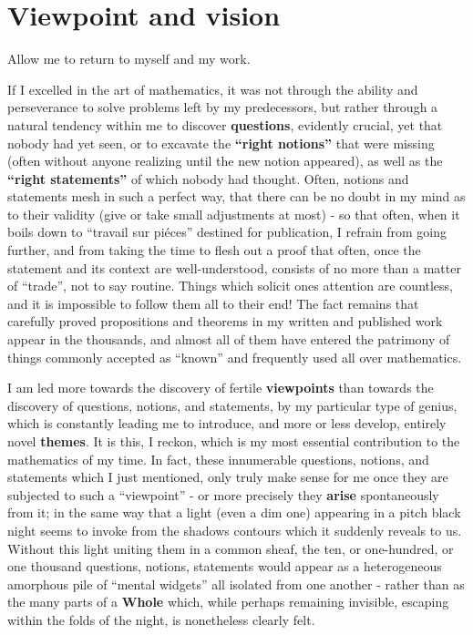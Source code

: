 \section{Viewpoint and vision}

Allow me to return to myself and my work.

If I excelled in the art of mathematics,
it was not through the ability and perseverance to solve problems left by my predecessors,
but rather through a natural tendency within me to 
discover \textbf{questions},
evidently crucial, yet that nobody had yet seen, or to excavate the \textbf{``right notions''}
that were missing
(often without anyone realizing until the new notion appeared), as well as the
\textbf{``right statements''} of which nobody had thought.
Often, notions and statements mesh in such a perfect way, that there can be no doubt in my
mind as to their validity (give or take small adjustments at most) - so that often, when
it boils down to ``travail sur pi\'eces'' destined for publication, I refrain from going
further, and from taking the time to flesh out a proof that often, once the statement and
its context are well-understood, consists of no more than a matter of ``trade'', not to
say routine.
Things which solicit ones attention are countless, and it is impossible to follow 
them all to their end! 
The fact remains that carefully proved propositions and theorems in my written and
published work appear in the thousands, and almost all of them have entered the 
patrimony of things commonly accepted as ``known'' and frequently used all over
mathematics.

I am led more towards the discovery of
fertile \textbf{viewpoints} 
than towards the discovery of questions, notions, and statements, by my particular type of
genius, which is constantly leading me to introduce, and more or
less develop, entirely novel \textbf{themes}. 
It is this, I reckon, which is my most essential contribution to the mathematics of my time.
In fact, these innumerable questions, notions, and statements which I just mentioned, only
truly make sense for me once they are subjected to such a ``viewpoint'' - or more
precisely they \textbf{arise} spontaneously from it; in the same way that a light (even a
dim one) appearing in a pitch black night seems to invoke from the shadows
contours which it suddenly reveals to us.
Without this light 
uniting them in a common sheaf, the ten, or one-hundred, or one thousand questions,
notions, statements would appear as a heterogeneous amorphous pile of 
``mental widgets'' all isolated from one another - 
rather than as the many parts of a
\textbf{Whole} which, while perhaps remaining invisible, 
escaping within the folds of the night,
is nonetheless clearly felt.

